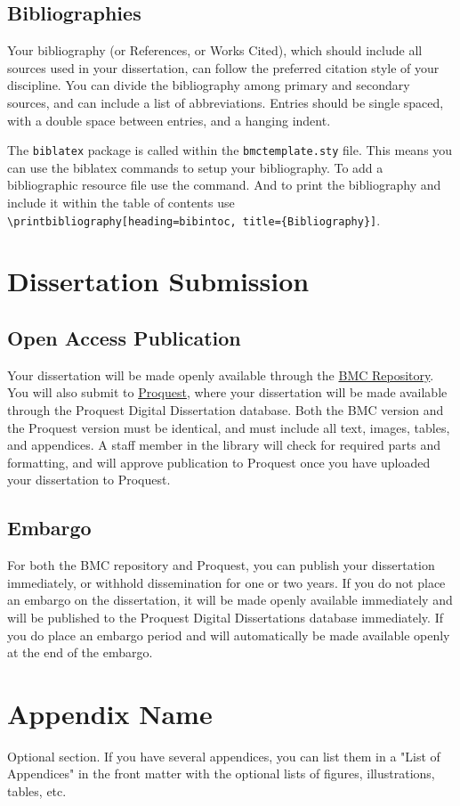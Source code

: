 \documentclass[12pt]{report}
\begin{document}
\section{Bibliographies}
Your bibliography (or References, or Works Cited), which should include all sources used in your dissertation, can follow the preferred citation style of your discipline. You can divide the bibliography among primary and secondary sources, and can include a list of abbreviations. Entries should be single spaced, with a double space between entries, and a hanging indent.~\parencite{schaffner_temporal_2014, batchelor_1953}

The \verb|biblatex| package is called within the \verb|bmctemplate.sty| file. This means you can use the biblatex commands to setup your bibliography. 
To add a bibliographic resource file use the \verb|| command. And to print the bibliography and include it within the table of contents use \verb|\printbibliography[heading=bibintoc, title={Bibliography}]|.

\chapter{Dissertation Submission}

\section{Open Access Publication}
Your dissertation will be made openly available through the \href{https://repository.brynmawr.edu/}{BMC Repository}. You will also submit to \href{https://www.proquest.com/}{Proquest}, where your dissertation will be made available through the Proquest Digital Dissertation database. Both the BMC version and the Proquest version must be identical, and must include all text, images, tables, and appendices. A staff member in the library will check for required parts and formatting, and will approve publication to Proquest once you have uploaded your dissertation to Proquest.
\section{Embargo}
For both the BMC repository and Proquest, you can publish your dissertation immediately, or withhold dissemination for one or two years. If you do not place an embargo on the dissertation, it will be made openly available immediately and will be published to the Proquest Digital Dissertations database immediately. If you do place an embargo period and will automatically be made available openly at the end of the embargo. 
\appendix
\chapter{Appendix Name}
Optional section. If you have several appendices, you can list them in a "List of Appendices" in the front matter with the optional lists of figures, illustrations, tables, etc.

\singlespacing
\printbibliography[heading=bibintoc, title={Bibliography}]
\end{document}
